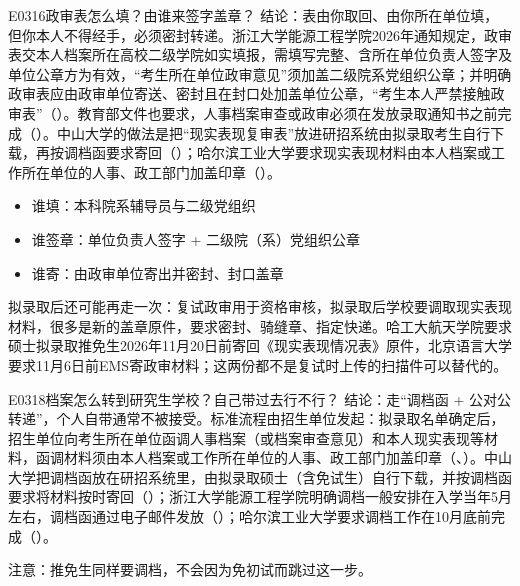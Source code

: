 \begin{qa}{E0316}{政审表怎么填？由谁来签字盖章？}
结论：表由你取回、由你所在单位填，但你本人不得经手，必须密封转递。浙江大学能源工程学院2026年通知规定，政审表交本人档案所在高校二级学院如实填报，需填写完整、含所在单位负责人签字及单位公章方为有效，“考生所在单位政审意见”须加盖二级院系党组织公章；并明确政审表应由政审单位寄送、密封且在封口处加盖单位公章，“考生本人严禁接触政审表”（）。教育部文件也要求，人事档案审查或政审必须在发放录取通知书之前完成（）。中山大学的做法是把“现实表现复审表”放进研招系统由拟录取考生自行下载，再按调档函要求寄回（）；哈尔滨工业大学要求现实表现材料由本人档案或工作所在单位的人事、政工部门加盖印章（）。

\begin{itemize}
  \item 谁填：本科院系辅导员与二级党组织
  \item 谁签章：单位负责人签字 + 二级院（系）党组织公章
  \item 谁寄：由政审单位寄出并密封、封口盖章
\end{itemize}
拟录取后还可能再走一次：复试政审用于资格审核，拟录取后学校要调取现实表现材料，很多是新的盖章原件，要求密封、骑缝章、指定快递。哈工大航天学院要求硕士拟录取推免生2026年11月20日前寄回《现实表现情况表》原件，北京语言大学要求11月6日前EMS寄政审材料；这两份都不是复试时上传的扫描件可以替代的。

\end{qa}

\begin{qa}{E0318}{档案怎么转到研究生学校？自己带过去行不行？}
结论：走“调档函 + 公对公转递”，个人自带通常不被接受。标准流程由招生单位发起：拟录取名单确定后，招生单位向考生所在单位函调人事档案（或档案审查意见）和本人现实表现等材料，函调材料须由本人档案或工作所在单位的人事、政工部门加盖印章（、）。中山大学把调档函放在研招系统里，由拟录取硕士（含免试生）自行下载，并按调档函要求将材料按时寄回（）；浙江大学能源工程学院明确调档一般安排在入学当年5月左右，调档函通过电子邮件发放（）；哈尔滨工业大学要求调档工作在10月底前完成（）。

注意：推免生同样要调档，不会因为免初试而跳过这一步。
\end{qa}

